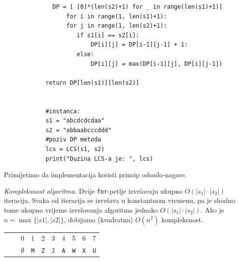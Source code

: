 \begin{solution}
\begin{verbatim}
	    	  DP = [ [0]*(len(s2)+1) for _ in range(len(s1)+1)]
	              for i in range(1, len(s1)+1):
	    	      for j in range(1, len(s2)+1):
	    		     if s1[i] == s2[i]: 
	    		         DP[i][j] = DP[i-1][j-1] + 1:
	    		     else:
	    		         DP[i][j] = max(DP[i-1][j], DP[i][j-1])
	    		          
	    	return DP[len(s1)][len(s2)]        
	    		           
	    	      
	    	#instanca:
	    	s1 = "abcdcdcdaa"
	    	s2 = "abbaabcccddd"
	    	#poziv DP metoda
	    	lcs = LCS(s1, s2)
	    	print("Duzina LCS-a je: ", lcs)     
 \end{verbatim}
	     Primijetimo da implementacija koristi princip odozdo-nagore.
	     
	     \textit{Kompleksnost algoritma}. Dvije \texttt{for}-petlje  izvršavaju ukupno $O(|s_1|\cdot |s_2|)$ iteracija. Svaka od iteracija se izvršava u konstantnom vremenu, pa je shodno tome ukupno vrijeme izvršavanja algoritma jednako $O(|s_1| \cdot |s_2|)$. Ako je $n = \max\{|s1|, |s2|\}$, dobijamo (kvadratnu) $O(n^2)$ kompleksnost. 
	     
     
     \begin{table}
     	  \centering
     	  \begin{tabular}{cc|cccccccc}
     	  	& & 0&1 &2 &3 &4 &5 &6 &7   \\
     	  
     	  	& & $\emptyset$&\texttt{M} &\texttt{Z} &\texttt{J} &\texttt{A} &\texttt{W} &\texttt{X} &\texttt{U}  \\ \hline \hline
     	  	

\end{tabular}
\end{table}
\end{solution}
